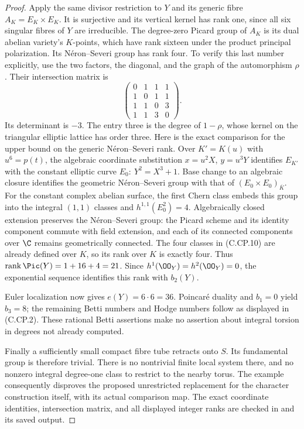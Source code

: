 \begin{proof}
Apply the same divisor restriction to $Y$ and its
generic fibre $A_K=E_K\times E_K$. It is surjective
and its vertical kernel has rank one, since all six
singular fibres of $Y$ are irreducible. The degree-zero
Picard group of $A_K$ is its dual abelian variety's
$K$-points, which have rank sixteen under the product
principal polarization. Its N\'eron--Severi group has
rank four. To verify this last number explicitly, use
the two factors, the diagonal, and the graph of the
automorphism $\rho$. Their intersection matrix is
\[
 \begin{pmatrix}
 0&1&1&1\\1&0&1&1\\1&1&0&3\\1&1&3&0
 \end{pmatrix}.                                \tag{C.CP.10}
\]
Its determinant is $-3$. The entry three is the degree of
$1-\rho$, whose kernel on the triangular elliptic
lattice has order three. Here is the exact comparison
for the upper bound on the generic N\'eron--Severi rank.
Over $K'=K(u)$ with $u^6=p(t)$, the algebraic
coordinate substitution $x=u^2X$, $y=u^3Y$ identifies
$E_{K'}$ with the constant elliptic curve
$E_0:\ Y^2=X^3+1$. Base change to an algebraic closure
identifies the geometric N\'eron--Severi group with that
of $(E_0\times E_0)_{\overline K}$. For the constant
complex abelian surface, the first Chern class embeds
this group into the integral $(1,1)$ classes and
$h^{1,1}(E_0^2)=4$. Algebraically closed extension
preserves the N\'eron--Severi group: the Picard scheme
and its identity component commute with field extension,
and each of its connected components over $\C$ remains
geometrically connected. The four classes
in (C.CP.10) are already defined over $K$, so its rank
over $K$ is exactly four. Thus
$\operatorname{rank}\Pic(Y)=1+16+4=21$.
Since $h^1(\OO_Y)=h^2(\OO_Y)=0$, the exponential
sequence identifies this rank with $b_2(Y)$.

Euler localization now gives $e(Y)=6\cdot6=36$.
Poincar\'e duality and $b_1=0$ yield $b_3=8$;
the remaining Betti numbers and Hodge numbers follow
as displayed in (C.CP.2). These rational Betti assertions
make no assertion about integral torsion in degrees
not already computed.

Finally a sufficiently small compact fibre tube retracts
onto $S$. Its fundamental group is therefore trivial.
There is no nontrivial finite local system there, and
no nonzero integral degree-one class to restrict to
the nearby torus. The example consequently disproves
the proposed unrestricted replacement for the character
construction itself, with its actual comparison map.
The exact coordinate identities, intersection matrix,
and all displayed integer ranks are checked in
 and its saved output.
\end{proof}

